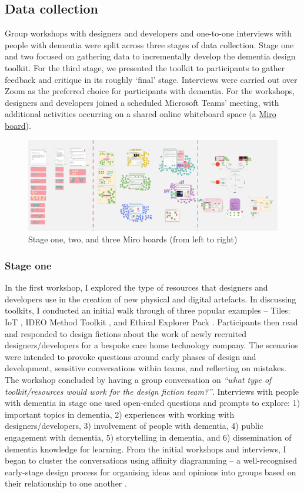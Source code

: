 \subsection{Data collection}
Group workshops with designers and developers and one-to-one interviews with people with dementia were split across three stages of data collection. Stage one and two focused on gathering data to incrementally develop the dementia design toolkit. For the third stage, we presented the toolkit to participants to gather feedback and critique in its roughly ‘final’ stage. Interviews were carried out over Zoom as the preferred choice for participants with dementia. For the workshops, designers and developers joined a scheduled Microsoft Teams’ meeting, with additional activities occurring on a shared online whiteboard space (a \href{https://miro.com}{Miro board}). 

\begin{figure}
\centering
\includegraphics[width=1\linewidth]{Images/D3Toolkit/Fig1.png}
\caption{Stage one, two, and three Miro boards (from left to right)}
\label{fig:StagesD3}
\end{figure}

\subsubsection{Stage one}
In the first workshop, I explored the type of resources that designers and developers use in the creation of new physical and digital artefacts. In discussing toolkits, I conducted an initial walk through of three popular examples – Tiles: IoT \citep{mora2017tiles}, IDEO Method Toolkit \citep{fraga2020inclusive}, and Ethical Explorer Pack \citep{network_ethical_nodate}. Participants then read and responded to design fictions about the work of newly recruited designers/developers for a bespoke care home technology company. The scenarios were intended to provoke questions around early phases of design and development, sensitive conversations within teams, and reflecting on mistakes. The workshop concluded by having a group conversation on \textit{“what type of toolkit/resources would work for the design fiction team?”}.
Interviews with people with dementia in stage one used open-ended questions and prompts to explore: 1) important topics in dementia, 2) experiences with working with designers/developers, 3) involvement of people with dementia, 4) public engagement with dementia, 5) storytelling in dementia, and 6) dissemination of dementia knowledge for learning.
From the initial workshops and interviews, I began to cluster the conversations using affinity diagramming – a well-recognised early-stage design process for organising ideas and opinions into groups based on their relationship to one another \citep{lucero2015using}. 

